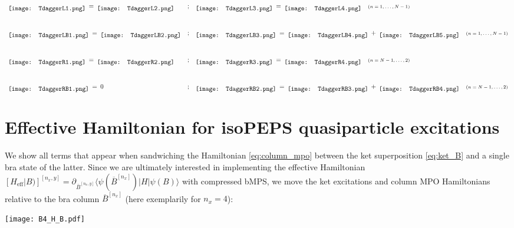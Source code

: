 \vspace*{2em}

\begin{equation*}
\begin{array}{l c l}
	\raisebox{-0.5\height}{\texttt{[image: TdaggerL1.png]}} 
	\:=\:
	\raisebox{-0.5\height}{\texttt{[image: TdaggerL2.png]}} 
\hspace{1em}& ; &
	\raisebox{-0.5\height}{\texttt{[image: TdaggerL3.png]}} 
	\:=\:
	\raisebox{-0.5\height}{\texttt{[image: TdaggerL4.png]}}
	\hspace{1em} \text{\scriptsize{$(n = 1, \ldots, N-1)$}}
\\[3em]
	\raisebox{-0.5\height}{\texttt{[image: TdaggerLB1.png]}} 
	\:=\: 
	\raisebox{-0.5\height}{\texttt{[image: TdaggerLB2.png]}} 
& ; &
	\raisebox{-0.5\height}{\texttt{[image: TdaggerLB3.png]}} 
	\:=\: 
	\raisebox{-0.5\height}{\texttt{[image: TdaggerLB4.png]}}
	\:+\:
	\raisebox{-0.5\height}{\texttt{[image: TdaggerLB5.png]}}
	\hspace{1em} \text{\scriptsize{$(n = 1, \ldots, N-1)$}}
\\[3em]
	\raisebox{-0.5\height}{\texttt{[image: TdaggerR1.png]}} 
	\:=\:
	\raisebox{-0.5\height}{\texttt{[image: TdaggerR2.png]}} 
& ; &
	\raisebox{-0.5\height}{\texttt{[image: TdaggerR3.png]}} 
	\:=\: 
	\raisebox{-0.5\height}{\texttt{[image: TdaggerR4.png]}}
	\hspace{1em} \text{\scriptsize{$(n = N-1, \ldots, 2)$}}
\\[3em]
	\raisebox{-0.5\height}{\texttt{[image: TdaggerRB1.png]}} 
	\:=\: 0
& ; &
	\raisebox{-0.5\height}{\texttt{[image: TdaggerRB2.png]}} 
	\:=\: 
	\raisebox{-0.5\height}{\texttt{[image: TdaggerRB3.png]}}
	\:+\:
	\raisebox{-0.5\height}{\texttt{[image: TdaggerRB4.png]}}
	\hspace{1em} \text{\scriptsize{$(n = N-1, \ldots, 2)$}}
\end{array}
\end{equation*}


\newpage
\section*{Effective Hamiltonian for isoPEPS quasiparticle excitations}
We show all terms that appear when sandwiching the Hamiltonian \eqref{eq:column_mpo} between the ket superposition \eqref{eq:ket_B} and a single bra state of the latter. Since we are ultimately interested in implementing the effective Hamiltonian $\left[ H_{\text{eff}} \vert B ) \right]^{[n_x, y]} = \partial_{\overline{B}^{[n_x, y]}} \langle \psi(\overline{B}^{[n_x]}) \vert H \vert \psi(B) \rangle$ with compressed bMPS, we move the ket excitations and column MPO Hamiltonians relative to the bra column $\overline{B}^{[n_x]}$ (here exemplarily for $n_x = 4$):
\begin{center}
\vspace*{-0.5em}
\texttt{[image: B4\_H\_B.pdf]}
\end{center}

